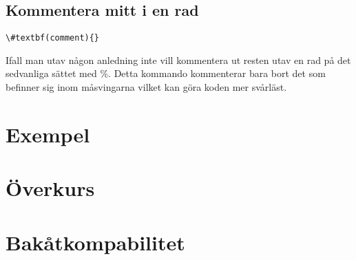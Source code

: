 \documentclass{article}
\newcommand{\citat}[1]{``#1''}
\begin{document}
\subsection{Kommentera mitt i en rad}
\begin{Verbatim}[commentchar=!, commandchars=\#\(\),numberblanklines=false]
\#textbf(comment){} 
\end{Verbatim}
Ifall man utav någon anledning inte vill kommentera ut resten utav en rad på det sedvanliga sättet med \%. Detta kommando kommenterar bara bort det som befinner sig inom måsvingarna vilket kan göra koden mer svårläst.

\section{Exempel}

\appendix


\section{Överkurs}





\section{Bakåtkompabilitet}




\printindex

%
%



\end{document}
